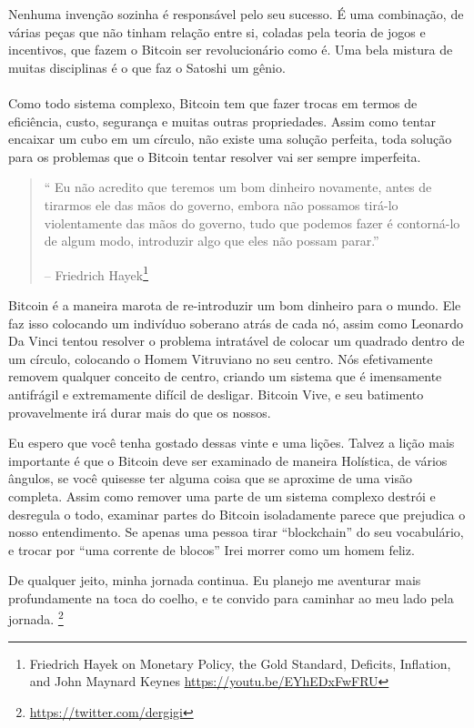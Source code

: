 Nenhuma invenção sozinha é responsável pelo seu sucesso. É uma combinação, de 
várias peças que não tinham relação entre si, coladas pela teoria de jogos e incentivos, 
que fazem o Bitcoin ser revolucionário como é. Uma bela mistura de muitas disciplinas 
é o que faz o Satoshi um gênio.

\paragraph{} Como todo sistema complexo, Bitcoin tem que fazer trocas 
em termos de eficiência, custo, segurança e muitas outras propriedades. Assim 
como tentar encaixar um cubo em um círculo, não existe uma solução perfeita, 
toda solução para os problemas que o Bitcoin tentar resolver vai ser sempre imperfeita.

\begin{quotation}\begin{samepage}
\enquote{ Eu não acredito que teremos um bom dinheiro novamente, antes de 
	tirarmos ele das mãos do governo, embora não possamos tirá-lo violentamente 
	das mãos do governo, tudo que podemos fazer é contorná-lo de algum modo, 
	introduzir algo que eles não possam parar.}
\begin{flushright} -- Friedrich Hayek\footnote{Friedrich Hayek on Monetary Policy, the Gold Standard, Deficits, Inflation, and John Maynard Keynes \url{https://youtu.be/EYhEDxFwFRU}}
\end{flushright}\end{samepage}\end{quotation}

Bitcoin é a maneira marota de re-introduzir um bom dinheiro para o mundo. 
Ele faz isso colocando um indivíduo soberano atrás de cada nó, assim como Leonardo Da Vinci 
tentou resolver o problema intratável de colocar um quadrado dentro de um círculo, 
colocando o Homem Vitruviano no seu centro. Nós efetivamente removem qualquer conceito de centro, 
criando um sistema que é imensamente antifrágil e extremamente difícil de desligar. 
Bitcoin Vive, e seu batimento provavelmente irá durar mais do que os nossos.

Eu espero que você tenha gostado dessas vinte e uma lições. Talvez a lição mais 
importante é que o Bitcoin deve ser examinado de maneira Holística, de vários ângulos, 
se você quisesse ter alguma coisa que se aproxime de uma visão completa. 
Assim como remover uma parte de um sistema complexo destrói e desregula o todo, 
examinar partes do Bitcoin isoladamente parece que prejudica o nosso entendimento. 
Se apenas uma pessoa tirar \enquote{blockchain} do seu vocabulário, e trocar por 
\enquote{uma corrente de blocos} Irei morrer como um homem feliz.

De qualquer jeito, minha jornada continua. Eu planejo me aventurar mais 
profundamente na toca do coelho, e te convido para caminhar ao meu lado pela jornada.
\footnote{\url{https://twitter.com/dergigi}}

%
